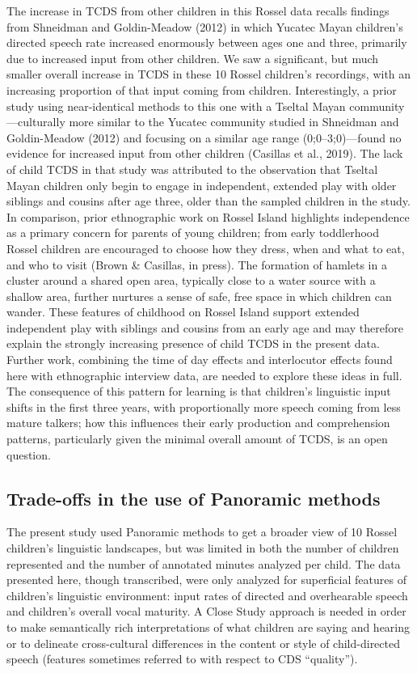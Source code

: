 \documentclass[,man,mask,floatsintext]{apa6}
\begin{document}
The increase in TCDS from other children in this Rossel data recalls
findings from Shneidman and Goldin-Meadow (2012) in which Yucatec Mayan
children's directed speech rate increased enormously between ages one
and three, primarily due to increased input from other children. We saw
a significant, but much smaller overall increase in TCDS in these 10
Rossel children's recordings, with an increasing proportion of that
input coming from children. Interestingly, a prior study using
near-identical methods to this one with a Tseltal Mayan
community---culturally more similar to the Yucatec community studied in
Shneidman and Goldin-Meadow (2012) and focusing on a similar age range
(0;0--3;0)---found no evidence for increased input from other children
(Casillas et al., 2019). The lack of child TCDS in that study was
attributed to the observation that Tseltal Mayan children only begin to
engage in independent, extended play with older siblings and cousins
after age three, older than the sampled children in the study. In
comparison, prior ethnographic work on Rossel Island highlights
independence as a primary concern for parents of young children; from
early toddlerhood Rossel children are encouraged to choose how they
dress, when and what to eat, and who to visit (Brown \& Casillas, in
press). The formation of hamlets in a cluster around a shared open area,
typically close to a water source with a shallow area, further nurtures
a sense of safe, free space in which children can wander. These features
of childhood on Rossel Island support extended independent play with
siblings and cousins from an early age and may therefore explain the
strongly increasing presence of child TCDS in the present data. Further
work, combining the time of day effects and interlocutor effects found
here with ethnographic interview data, are needed to explore these ideas
in full. The consequence of this pattern for learning is that children's
linguistic input shifts in the first three years, with proportionally
more speech coming from less mature talkers; how this influences their
early production and comprehension patterns, particularly given the
minimal overall amount of TCDS, is an open question.

\subsection{Trade-offs in the use of Panoramic
methods}\label{trade-offs-in-the-use-of-panoramic-methods}

The present study used Panoramic methods to get a broader view of 10
Rossel children's linguistic landscapes, but was limited in both the
number of children represented and the number of annotated minutes
analyzed per child. The data presented here, though transcribed, were
only analyzed for superficial features of children's linguistic
environment: input rates of directed and overhearable speech and
children's overall vocal maturity. A Close Study approach is needed in
order to make semantically rich interpretations of what children are
saying and hearing or to delineate cross-cultural differences in the
content or style of child-directed speech (features sometimes referred
to with respect to CDS \enquote{quality}).
\end{document}
